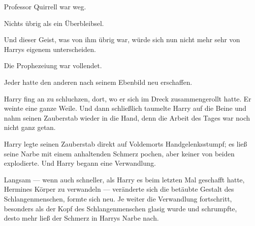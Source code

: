 Professor Quirrell war weg.

Nichts übrig als ein Überbleibsel.

Und dieser Geist, was von ihm übrig war, würde sich nun nicht mehr sehr von Harrys eigenem unterscheiden.

Die Prophezeiung war vollendet.

Jeder hatte den anderen nach seinem Ebenbild neu erschaffen.

Harry fing an zu schluchzen, dort, wo er sich im Dreck zusammengerollt hatte.
Er weinte eine ganze Weile.
Und dann schließlich taumelte Harry auf die Beine und nahm seinen Zauberstab wieder in die Hand, denn die Arbeit des Tages war noch nicht ganz getan.

\later

Harry legte seinen Zauberstab direkt auf Voldemorts Handgelenksstumpf; es ließ seine Narbe mit einem anhaltenden Schmerz pochen, aber keiner von beiden explodierte. Und Harry begann eine Verwandlung.

Langsam — wenn auch schneller, als Harry es beim letzten Mal geschafft hatte, Hermines Körper zu verwandeln — veränderte sich die betäubte Gestalt des Schlangenmenschen, formte sich neu. Je weiter die Verwandlung fortschritt, besonders als der Kopf des Schlangenmenschen glasig wurde und schrumpfte, desto mehr ließ der Schmerz in Harrys Narbe nach.

